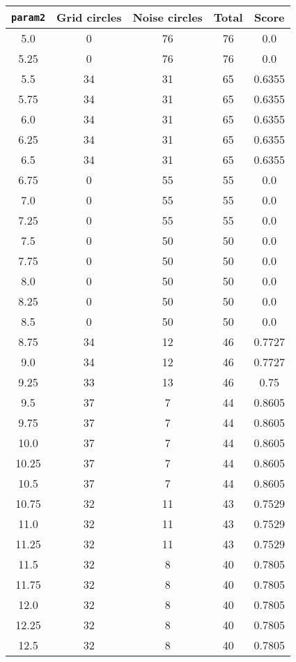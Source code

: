 \documentclass[letterpaper, 12pt]{article}
\begin{document}
\begin{longtable}{|c|c|c|c|c|}
\hline
\textbf{\texttt{param2}} & \textbf{Grid circles} & \textbf{Noise circles} & \textbf{Total} & \textbf{Score} \\
\hline
5.0 & 0 & 76 & 76 & 0.0 \\
\hline
5.25 & 0 & 76 & 76 & 0.0 \\
\hline
5.5 & 34 & 31 & 65 & 0.6355 \\
\hline
5.75 & 34 & 31 & 65 & 0.6355 \\
\hline
6.0 & 34 & 31 & 65 & 0.6355 \\
\hline
6.25 & 34 & 31 & 65 & 0.6355 \\
\hline
6.5 & 34 & 31 & 65 & 0.6355 \\
\hline
6.75 & 0 & 55 & 55 & 0.0 \\
\hline
7.0 & 0 & 55 & 55 & 0.0 \\
\hline
7.25 & 0 & 55 & 55 & 0.0 \\
\hline
7.5 & 0 & 50 & 50 & 0.0 \\
\hline
7.75 & 0 & 50 & 50 & 0.0 \\
\hline
8.0 & 0 & 50 & 50 & 0.0 \\
\hline
8.25 & 0 & 50 & 50 & 0.0 \\
\hline
8.5 & 0 & 50 & 50 & 0.0 \\
\hline
8.75 & 34 & 12 & 46 & 0.7727 \\
\hline
9.0 & 34 & 12 & 46 & 0.7727 \\
\hline
9.25 & 33 & 13 & 46 & 0.75 \\
\hline
9.5 & 37 & 7 & 44 & 0.8605 \\
\hline
9.75 & 37 & 7 & 44 & 0.8605 \\
\hline
10.0 & 37 & 7 & 44 & 0.8605 \\
\hline
10.25 & 37 & 7 & 44 & 0.8605 \\
\hline
10.5 & 37 & 7 & 44 & 0.8605 \\
\hline
10.75 & 32 & 11 & 43 & 0.7529 \\
\hline
11.0 & 32 & 11 & 43 & 0.7529 \\
\hline
11.25 & 32 & 11 & 43 & 0.7529 \\
\hline
11.5 & 32 & 8 & 40 & 0.7805 \\
\hline
11.75 & 32 & 8 & 40 & 0.7805 \\
\hline
12.0 & 32 & 8 & 40 & 0.7805 \\
\hline
12.25 & 32 & 8 & 40 & 0.7805 \\
\hline
12.5 & 32 & 8 & 40 & 0.7805 \\

\end{longtable}
\end{document}
